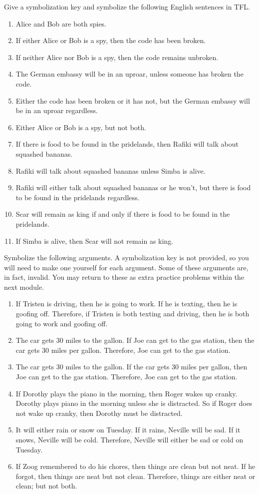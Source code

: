 \problempart
Give a symbolization key and symbolize the following English sentences in TFL.
\begin{enumerate}
\item Alice and Bob are both spies.
\item If either Alice or Bob is a spy, then the code has been broken.
\item If neither Alice nor Bob is a spy, then the code remains unbroken.
\item The German embassy will be in an uproar, unless someone has broken the code.
\item Either the code has been broken or it has not, but the German embassy will be in an uproar regardless.
\item Either Alice or Bob is a spy, but not both.
\item If there is food to be found in the pridelands, then Rafiki will talk about squashed bananas.
\item Rafiki will talk about squashed bananas unless Simba is alive.
\item Rafiki will either talk about squashed bananas or he won't, but there is food to be found in the pridelands regardless.
\item Scar will remain as king if and only if there is food to be found in the pridelands.
\item If Simba is alive, then Scar will not remain as king.
\end{enumerate}

\problempart
Symbolize the following arguments. A symbolization key is not provided, so you will need to make one yourself for each argument. Some of these arguments are, in fact, invalid. You may return to these as extra practice problems within the next module.
\begin{enumerate}
\item If Tristen is driving, then he is going to work. If he is texting, then he is goofing off. Therefore, if Tristen is both texting and driving, then he is both going to work and goofing off.
\item The car gets 30 miles to the gallon. If Joe can get to the gas station, then the car gets 30 miles per gallon. Therefore, Joe can get to the gas station.
\item The car gets 30 miles to the gallon. If the car gets 30 miles per gallon, then Joe can get to the gas station. Therefore, Joe can get to the gas station.
\item If Dorothy plays the piano in the morning, then Roger wakes up cranky. Dorothy plays piano in the morning unless she is distracted. So if Roger does not wake up cranky, then Dorothy must be distracted.
\item It will either rain or snow on Tuesday. If it rains, Neville will be sad. If it snows, Neville will be cold. Therefore, Neville will either be sad or cold on Tuesday.
\item If Zoog remembered to do his chores, then things are clean but not neat. If he forgot, then things are neat but not clean. Therefore, things are either neat or clean; but not both.
\end{enumerate}

